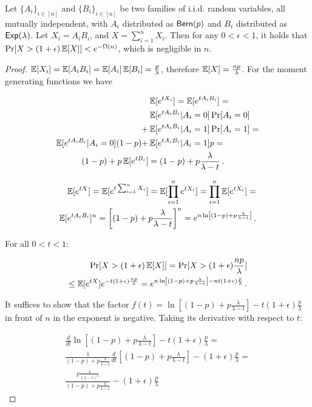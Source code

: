 \begin{theorem}
  Let $\{ A_i \}_{i \in [n]}$ and $\{ B_i \}_{i \in [n]}$ be two families of i.i.d. random variables,
  all mutually independent,
  with $A_i$ distributed as $\textsf{Bern}(p)$ and $B_i$ distributed as $\textsf{Exp}(\lambda)$.
  Let $X_i = A_i B_i$, and $X = \sum_{i = 1}^n X_i$.
  Then for any $0 < \epsilon < 1$, it holds that
  $\Pr[X > (1 + \epsilon) \mathop{{}\mathbb{E}}[X]] < e^{-\Omega(n)}$,
  which is negligible in $n$.
\end{theorem}
\begin{proof}
  $\mathop{{}\mathbb{E}}[X_i] = \mathop{{}\mathbb{E}}[A_i B_i] = \mathop{{}\mathbb{E}}[A_i] \mathop{{}\mathbb{E}}[B_i] = \frac{p}{\lambda}$, therefore
  $\mathop{{}\mathbb{E}}[X] = \frac{np}{\lambda}$. For the moment generating functions we have

  \begin{align*}
    &\mathop{{}\mathbb{E}}[e^{t X_i}] = \mathop{{}\mathbb{E}}[e^{t A_i B_i}] =\\
      &\mathop{{}\mathbb{E}}[e^{t A_i B_i}|A_i = 0] \Pr[A_i = 0]\\
    + &\mathop{{}\mathbb{E}}[e^{t A_i B_i}|A_i = 1] \Pr[A_i = 1] = \\
    \mathop{{}\mathbb{E}}[e^{t A_i B_i}|A_i = 0] (1 - p) + &\mathop{{}\mathbb{E}}[e^{t A_i B_i}|A_i = 1] p = \\
    (1 - p) + p \mathop{{}\mathbb{E}}[e^{t B_i}] &= (1 - p) + p \frac{\lambda}{\lambda - t}\,.
  \end{align*}

  \begin{align*}
    \mathop{{}\mathbb{E}}[e^{tX}] = \mathop{{}\mathbb{E}}[e^{t \sum_{i = 1}^n X_i}] = \mathop{{}\mathbb{E}}[\prod_{i = 1}^n e^{t X_i}] = \prod_{i = 1}^n \mathop{{}\mathbb{E}}[e^{t X_i}] = \\
    \mathop{{}\mathbb{E}}[e^{t A_i B_i}]^n = \left[(1 - p) + p\frac{\lambda}{\lambda - t}\right]^n = e^{n \ln\left[(1 - p) + p\frac{\lambda}{\lambda - t}\right]}\,.
  \end{align*}

  For all $0 < t < 1$:

  \begin{align*}
    \Pr[X > (1 + \epsilon)\mathop{{}\mathbb{E}}[X]] = \Pr[X > (1 + \epsilon)\frac{np}{\lambda}]\\
    \leq \mathop{{}\mathbb{E}}[e^{tX}] e^{-t(1 + \epsilon)\frac{np}{\lambda}}
    = e^{n \ln\left[(1 - p) + p\frac{\lambda}{\lambda - t}\right] - n t(1 + \epsilon)\frac{p}{\lambda}}\,.
  \end{align*}

  It suffices to show that the factor
  $f(t) = \ln\left[(1 - p) + p\frac{\lambda}{\lambda - t}\right] - t(1 + \epsilon)\frac{p}{\lambda}$
  in front of $n$ in the exponent is negative. Taking its derivative with respect to $t$:

  \begin{align*}
    \frac{d}{dt} \ln\left[(1 - p) + p\frac{\lambda}{\lambda - t}\right] - t(1 + \epsilon)\frac{p}{\lambda} = \\
    \frac{1}{(1 - p) + p\frac{\lambda}{\lambda - t}} \frac{d}{dt} \left[(1 - p) + p\frac{\lambda}{\lambda - t}\right] - (1 + \epsilon)\frac{p}{\lambda} = \\
    \frac{p\frac{\lambda}{(\lambda - t)^2}}{(1 - p) + p\frac{\lambda}{\lambda - t}} - (1 + \epsilon)\frac{p}{\lambda}
  \end{align*}
  

\end{proof}
